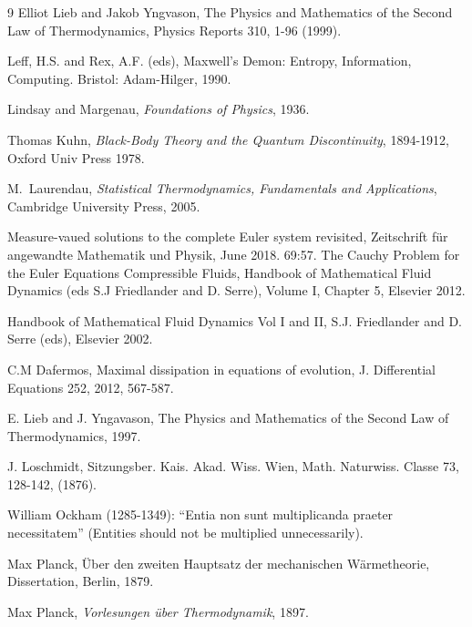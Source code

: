 \begin{thebibliography}{9}
 Elliot Lieb and Jakob Yngvason, The Physics and Mathematics
of the Second Law of Thermodynamics, Physics Reports 310, 1-96 (1999).



 Leff, H.S. and Rex, A.F. (eds),
Maxwell's Demon: Entropy, Information, Computing. 
Bristol: Adam-Hilger, 1990. 

 Lindsay and Margenau, \emph{Foundations of Physics},
1936.

 Thomas Kuhn, \emph{Black-Body Theory and the 
Quantum Discontinuity},
1894-1912, Oxford Univ Press 1978.

 M.~Laurendau, \emph{Statistical Thermodynamics, Fundamentals
and Applications}, Cambridge University Press, 2005.

 Measure-vaued solutions to the complete Euler system revisited, Zeitschrift f\"ur angewandte Mathematik und Physik, June 2018. 69:57.
 The Cauchy Problem for the Euler Equations Compressible Fluids, Handbook of Mathematical Fluid Dynamics (eds S.J Friedlander and D. Serre), Volume I, Chapter 5, Elsevier 2012.

 Handbook of Mathematical Fluid Dynamics Vol I and II, S.J. Friedlander and D. Serre (eds), Elsevier 2002.

 C.M Dafermos, Maximal dissipation in equations of evolution, J. Differential Equations 252, 2012, 567-587.







 E. Lieb and J. Yngavason, The Physics and Mathematics of the Second Law of Thermodynamics, 1997.



 J. Loschmidt, Sitzungsber. Kais. Akad. Wiss. Wien, Math. 
Naturwiss. Classe 73, 128-142, (1876).


 William Ockham (1285-1349):
``Entia non sunt multiplicanda praeter necessitatem''
(Entities should not be multiplied unnecessarily). 

 Max Planck, \"Uber den zweiten Hauptsatz der mechanischen 
W\"armetheorie, Dissertation, Berlin, 1879.

 Max Planck, \emph{Vorlesungen \"uber Thermodynamik}, 1897.


\end{thebibliography}
